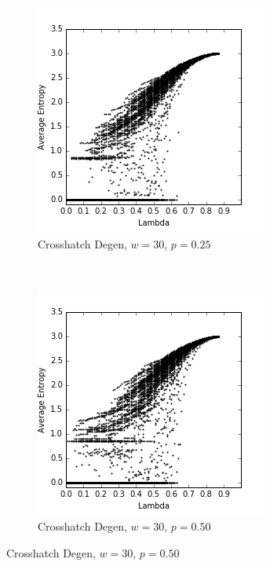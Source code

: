 \documentclass[a4paper,11pt,twoside]{report}
\begin{document}
\begin{figure}[htp]
\centering
\begin{subfigure}[t]{0.4\textwidth}
  \includegraphics[width=\textwidth]{ch6_figs/ch_w30_p25_entropy_scatter}
  \caption{Crosshatch Degen, $w=30$, $p=0.25$}

\end{subfigure}
~
\begin{subfigure}[t]{0.4\textwidth}
  \centering
  \includegraphics[width=\textwidth]{ch6_figs/ch_w30_p50_entropy_scatter}
  \caption{Crosshatch Degen, $w=30$, $p=0.50$}


\end{subfigure}
\end{figure}
\end{document}
